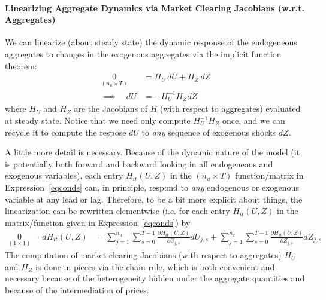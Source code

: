 \documentclass[12pt]{article}
\theoremstyle{plain}
\theoremstyle{definition}
\theoremstyle{remark}
\begin{document}
\paragraph{%
  Linearizing Aggregate Dynamics via Market Clearing Jacobians (w.r.t.
  Aggregates)
}
We can linearize (about steady state) the dynamic response of the
endogeneous aggregates to changes in the exogenous aggregates via the
implicit function theorem:
\begin{align*}
  \underset{(n_u\times T)}{0}
  &=
  H_U \, dU + H_Z \, dZ
  \\
  \implies\quad
  dU
  &=
  -H_U^{-1} H_Z dZ
\end{align*}
where $H_U$ and $H_Z$ are the Jacobians of $H$ (with respect to
aggregates) evaluated at steady state.
Notice that we need only compute $H_U^{-1}H_Z$ once, and we can recycle
it to compute the respose $dU$ to \emph{any} sequence of exogenous
shocks $dZ$.

A little more detail is necessary.
Because of the dynamic nature of the model (it is potentially both
forward and backward looking in all endogeneous and exogenous
variables), each entry $H_{it}(U,Z)$ in the $(n_u\times T)$
function/matrix in Expression~\ref{eqconds} can, in principle, respond
to \emph{any} endogenous or exogenous variable at any lead or lag.
Therefore, to be a bit more explicit about things, the linearization can
be rewritten elementwise (i.e. for each entry $H_{it}(U,Z)$ in the
matrix/function given in Expression~\ref{eqconds}) by
\begin{align*}
  \underset{(1 \times 1)}{0}
  =
  dH_{it}(U,Z)
  &=
  \sum_{j=1}^{n_u}
  \sum_{s=0}^{T-1}
  \frac{\partial H_{it}(U,Z)}{\partial U_{j,s}}
  dU_{j,s}
  +
  \sum_{j=1}^{n_z}
  \sum_{s=0}^{T-1}
  \frac{\partial H_{it}(U,Z)}{\partial Z_{j,s}}
  dZ_{j,s}
\end{align*}
The computation of market clearing Jacobians (with respect to
aggregates) $H_U$ and $H_Z$ is done in pieces via the chain rule, which
is both convenient and necessary because of the heterogeneity hidden
under the aggregate quantities and because of the intermediation of
prices.

\clearpage
\end{document}
